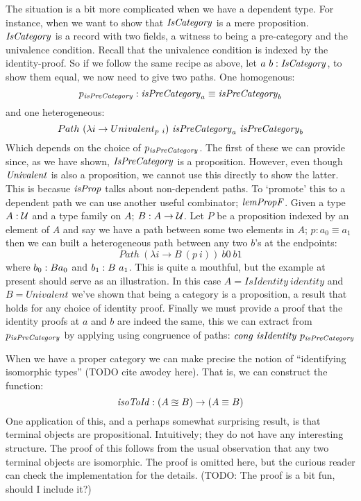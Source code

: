 The situation is a bit more complicated when we have a dependent type. For
instance, when we want to show that $\mathit{IsCategory}$ is a mere proposition.
$\mathit{IsCategory}$ is a record with two fields, a witness to being a pre-category and
the univalence condition. Recall that the univalence condition is indexed by the
identity-proof. So if we follow the same recipe as above, let $a\ b \;\mathord{:}\;
\mathit{IsCategory}$, to show them equal, we now need to give two paths. One homogenous:
%
$$
p_{\mathit{isPreCategory}} \;\mathord{:}\; \mathit{isPreCategory}_a \equiv \mathit{isPreCategory}_b
$$
%
and one heterogeneous:
%
$$
Path\ (\lambda i \to Univalent_{p\ i})\ \isPreCategory_a\ \isPreCategory_b
$$
%
Which depends on the choice of $p_{\mathit{isPreCategory}}$. The first of these we can
provide since, as we have shown, $\mathit{IsPreCategory}$ is a proposition. However,
even though $\mathit{Univalent}$ is also a proposition, we cannot use this directly to
show the latter. This is becasue $\mathit{isProp}$ talks about non-dependent paths. To
`promote' this to a dependent path we can use another useful combinator;
$\mathit{lemPropF}$. Given a type $A \;\mathord{:}\; \mathcal{U}$ and a type family on $A$; $B : A \to
\mathcal{U}$. Let $P$ be a proposition indexed by an element of $A$ and say we have a
path between some two elements in $A$; $p : a_0 \equiv a_1$ then we can built a
heterogeneous path between any two $b$'s at the endpoints:
%
$$
Path\ (\lambda i \to B\ (p\ i))\ b0\ b1
$$
%
where $b_0 \;\mathord{:}\; B a_0$ and $b_1 \;\mathord{:}\; B\ a_1$. This is quite a mouthful, but the
example at present should serve as an illustration. In this case $A =
\mathit{IsIdentity}\ \mathit{identity}$ and $B = \mathit{Univalent}$ we've shown
that being a category is a proposition, a result that holds for any choice of
identity proof. Finally we must provide a proof that the identity proofs at $a$
and $b$ are indeed the same, this we can extract from $p_{\mathit{isPreCategory}}$ by
applying using congruence of paths: $\congruence\ \mathit{isIdentity}\
p_{\isPreCategory}$

When we have a proper category we can make precise the notion of ``identifying
isomorphic types'' (TODO cite awodey here). That is, we can construct the
function:
%
$$
\mathit{isoToId} \;\mathord{:}\; (A \approxeq B) \to (A \equiv B)
$$
%
One application of this, and a perhaps somewhat surprising result, is that
terminal objects are propositional. Intuitively; they do not have any
interesting structure. The proof of this follows from the usual observation that
any two terminal objects are isomorphic. The proof is omitted here, but the
curious reader can check the implementation for the details. (TODO: The proof is
a bit fun, should I include it?)

